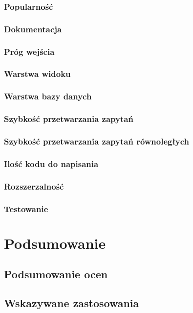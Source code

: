 \documentclass[12pt]{report}
\begin{document}
    \subsection{Popularność}
    \subsection{Dokumentacja}
    \subsection{Próg wejścia}
    \subsection{Warstwa widoku}
    \subsection{Warstwa bazy danych}
    \subsection{Szybkość przetwarzania zapytań}
    \subsection{Szybkość przetwarzania zapytań równoległych}
    \subsection{Ilość kodu do napisania}
    \subsection{Rozszerzalność}
    \subsection{Testowanie}

\chapter{Podsumowanie}
  \section{Podsumowanie ocen}
  \section{Wskazywane zastosowania}
\end{document}
